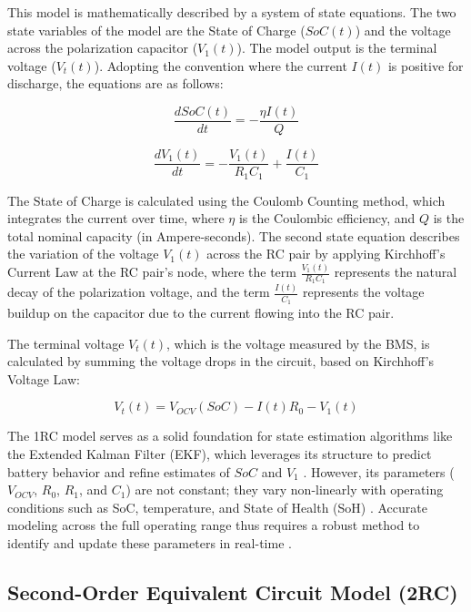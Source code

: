\documentclass[lettersize,journal]{IEEEtran}
\begin{document}
This model is mathematically described by a system of state equations. The two state variables of the model are the State of Charge ($SoC(t)$) and the voltage across the polarization capacitor ($V_1(t)$). The model output is the terminal voltage ($V_t(t)$). Adopting the convention where the current $I(t)$ is positive for discharge, the equations are as follows:

\begin{equation}
	\label{eq:soc}
	\frac{dSoC(t)}{dt} = - \frac{\eta I(t)}{Q}
\end{equation}

\begin{equation}
	\label{eq:v1}
	\frac{dV_1(t)}{dt} = - \frac{V_1(t)}{R_1 C_1} + \frac{I(t)}{C_1}
\end{equation}

The State of Charge is calculated using the Coulomb Counting method, which integrates the current over time, where $\eta$ is the Coulombic efficiency, and $Q$ is the total nominal capacity (in Ampere-seconds)\cite{xie2023state}. The second state equation describes the variation of the voltage $V_1(t)$ across the RC pair by applying Kirchhoff's Current Law at the RC pair's node, where the term $\frac{V_1(t)}{R_1 C_1}$ represents the natural decay of the polarization voltage, and the term $\frac{I(t)}{C_1}$ represents the voltage buildup on the capacitor due to the current flowing into the RC pair.

The terminal voltage $V_t(t)$, which is the voltage measured by the BMS, is calculated by summing the voltage drops in the circuit, based on Kirchhoff's Voltage Law:

\begin{equation}
	\label{eq:vt}
	V_t(t) = V_{OCV}(SoC) - I(t)R_0 - V_1(t)
\end{equation}

The 1RC model serves as a solid foundation for state estimation algorithms like the Extended Kalman Filter (EKF), which leverages its structure to predict battery behavior and refine estimates of $SoC$ and $V_1$ \cite{xie2023state, pai2023online}. However, its parameters ($V_{OCV}$, $R_0$, $R_1$, and $C_1$) are not constant; they vary non-linearly with operating conditions such as SoC, temperature, and State of Health (SoH) \cite{tran2021comprehensive}. Accurate modeling across the full operating range thus requires a robust method to identify and update these parameters in real-time \cite{yang2023improved, pai2023online}.

\subsection{Second-Order Equivalent Circuit Model (2RC)}
\end{document}
